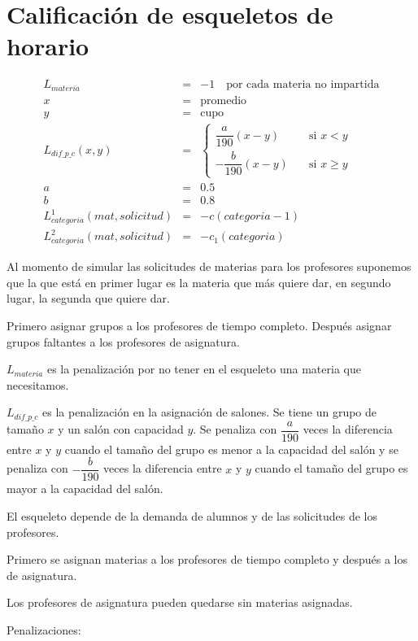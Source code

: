 \section{Calificación de esqueletos de horario}

\begin{eqnarray*}
L_{materia} &=& -1 \,\,\,\,\,\,  \text{por cada materia no impartida}\\
x &=& \text{promedio}\\
y &=& \text{cupo}\\
L_{dif\_p\_c} (x,y) &=& \begin{cases}
    \dfrac{a}{190} (x-y)  & \quad \text{si } x<y\\
    - \dfrac{b}{190} (x-y)  & \quad \text{si } x\geqslant y
  \end{cases}\\
a &=& 0.5\\
b &=& 0.8\\
L_{categoria}^{1} (mat,solicitud) &=& -c(categoria - 1)\\
L_{categoria}^{2} (mat,solicitud) &=& -c_{1}(categoria)
\end{eqnarray*}

Al momento de simular las solicitudes de materias para los profesores suponemos que la que está en primer lugar es la materia que más quiere dar, en segundo lugar, la segunda que quiere dar.

Primero asignar grupos a los profesores de tiempo completo. Después asignar grupos faltantes a los profesores de asignatura.

$L_{materia}$ es la penalización por no tener en el esqueleto una materia que necesitamos.

$L_{dif\_p\_c}$ es la penalización en la asignación de salones. Se tiene un grupo de tamaño $x$ y un salón con capacidad $y$. Se penaliza con $\dfrac{a}{190}$ veces la diferencia entre $x$ y $y$ cuando el tamaño del grupo es menor a la capacidad del salón y se penaliza con $-\dfrac{b}{190}$ veces la diferencia entre $x$ y $y$ cuando el tamaño del grupo es mayor a la capacidad del salón.

El esqueleto depende de la demanda de alumnos y de las solicitudes de los profesores.

Primero se asignan materias a los profesores de tiempo completo y después a los de asignatura.

Los profesores de asignatura pueden quedarse sin materias asignadas.

Penalizaciones:

